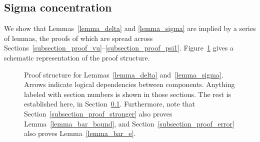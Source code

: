 \documentclass{article}
\theoremstyle{plain}
\theoremstyle{remark}
\theoremstyle{plain}
\numberwithin{equation}{section}
\begin{document}
	\subsection{Sigma concentration}\label{subsection_proof_concentration}
	
	We show that Lemmas~\ref{lemma_delta} and \ref{lemma_sigma} are implied by a series of lemmas, the proofs of which are spread across Sections~\ref{subsection_proof_vu}--\ref{subsection_proof_psi1}. Figure~\ref{fig:proof-framework-2} gives a schematic representation of the proof structure.
	
	\begin{figure}[htbp]
		\centering
		\caption{Proof structure for Lemmas~\ref{lemma_delta} and~\ref{lemma_sigma}. Arrows indicate logical dependencies between components. Anything labeled with section numbers is shown in those sections. The rest is established here, in Section~\ref{subsection_proof_concentration}. Furthermore, note that Section~\ref{subsection_proof_stronger} also proves Lemma~\ref{lemma_bar_bound}, and Section~\ref{subsection_proof_error} also proves Lemma~\ref{lemma_bar_e}.}
		\label{fig:proof-framework-2}
	\end{figure}
	
\end{document}
